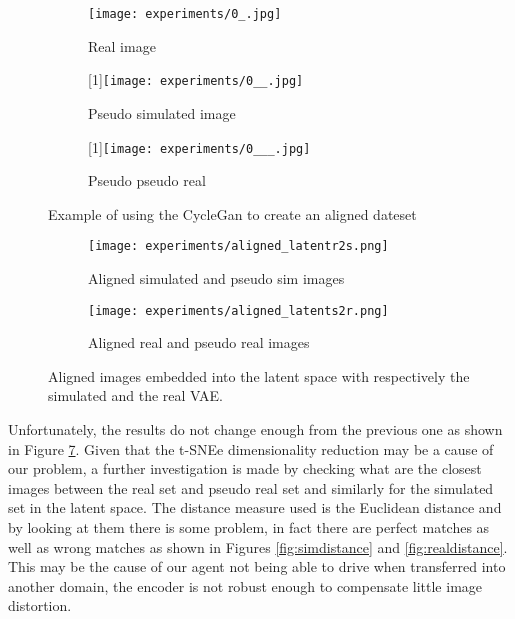 \begin{figure}[h]
  \centering
  \begin{subfigure}{.33\linewidth}
      \centering
      \texttt{[image: experiments/0\_.jpg]}
      \caption{Real image}\label{fig:real}
  \end{subfigure}%
      \hfill
  \begin{subfigure}{.33\linewidth}
      \centering
      \scalebox{-1}[1]{\texttt{[image: experiments/0\_\_.jpg]}}
      \caption{Pseudo simulated image}\label{fig:psim}
  \end{subfigure}%
  \hfill
  \begin{subfigure}{.33\linewidth}
    \centering
    \scalebox{-1}[1]{\texttt{[image: experiments/0\_\_\_.jpg]}}
    \caption{Pseudo pseudo real}\label{fig:ppreal}
  \end{subfigure} 
  \caption{Example of using the CycleGan to create an aligned dateset}
  \label{fig:examplealigned}
\end{figure}

\begin{figure}[h]
  \centering
  \begin{subfigure}{.5\linewidth}
      \centering
      \texttt{[image: experiments/aligned\_latentr2s.png]}
      \caption{Aligned simulated and pseudo sim images}\label{fig:aligen_latentr2s}
  \end{subfigure}%
      \hfill
  \begin{subfigure}{.5\linewidth}
      \centering
      \texttt{[image: experiments/aligned\_latents2r.png]}
      \caption{Aligned real and pseudo real images}\label{fig:aligen_latents2r}
  \end{subfigure}
  \caption{Aligned images embedded into the latent space with respectively the simulated and the real VAE.}
  \label{fig:latentpseudoaligned}
\end{figure}
Unfortunately, the results do not change enough from the previous one as shown in Figure \ref{fig:latentpseudoaligned}. Given that the t-SNEe dimensionality reduction may be a cause of our problem, a further investigation is made by checking what are the closest images between the real set and pseudo real set and similarly for the simulated set in the latent space. The distance measure used is the Euclidean distance and by looking at them there is some problem, in fact there are perfect matches as well as wrong matches as shown in Figures \ref{fig:simdistance} and \ref{fig:realdistance}. This may be the cause of our agent not being able to drive when transferred into another domain, the encoder is not robust enough to compensate little image distortion.

